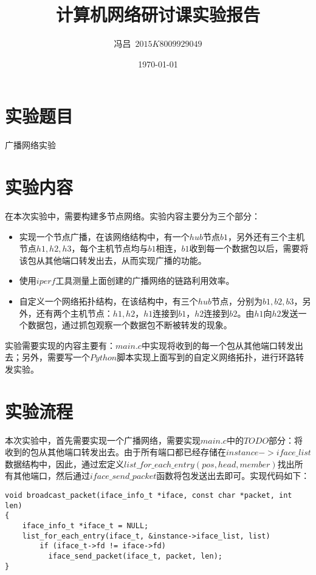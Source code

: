 \documentclass[UTF8,noindent]{ctexart}
\title{\CJKfamily{zhkai}计算机网络研讨课实验报告}
\author{{\CJKfamily{zhkai}冯吕}\ $2015K8009929049$}
\date{\today}
\begin{document}
\maketitle
{}
\section*{{实验题目}} 广播网络实验
\section*{{实验内容}}
在本次实验中，需要构建多节点网络。实验内容主要分为三个部分：
\begin{itemize}
  \item 实现一个节点广播，在该网络结构中，有一个$hub$节点$b1$，另外还有三个主机节点$h1, h2, h3$，每个主机节点均与$b1$相连，$b1$收到每一个数据包以后，需要将该包从其他端口转发出去，从而实现广播的功能。
	\item 使用$iperf$工具测量上面创建的广播网络的链路利用效率。
	\item 自定义一个网络拓扑结构，在该结构中，有三个$hub$节点，分别为$b1,b2,b3$，另外，还有两个主机节点：$h1, h2$，$h1$连接到$b1$，$h2$连接到$b2$。由$h1$向$h2$发送一个数据包，通过抓包观察一个数据包不断被转发的现象。
\end{itemize}

实验需要实现的内容主要有：$main.c$中实现将收到的每一个包从其他端口转发出去；另外，需要写一个$Python$脚本实现上面写到的自定义网络拓扑，进行环路转发实验。

		\section*{{实验流程}}
		本次实验中，首先需要实现一个广播网络，需要实现$main.c$中的$TODO$部分：将收到的包从其他端口转发出去。由于所有端口都已经存储在$instance->iface\_list$数据结构中，因此，通过宏定义$list\_for\_each\_entry(pos, head, member)$找出所有其他端口，然后通过$iface\_send\_packet$函数将包发送出去即可。实现代码如下：
\begin{lstlisting}
void broadcast_packet(iface_info_t *iface, const char *packet, int len)
{
	iface_info_t *iface_t = NULL;
	list_for_each_entry(iface_t, &instance->iface_list, list)
		if (iface_t->fd != iface->fd)
		  iface_send_packet(iface_t, packet, len);
}
\end{lstlisting}
\end{document}
